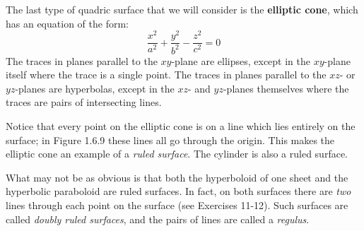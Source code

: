 The last type of quadric surface that we will consider is the \textbf{elliptic cone}, which has
an equation of the form:
\begin{equation}\label{eqn:ellipcone}
 \frac{x^2}{a^2} + \frac{y^2}{b^2} - \frac{z^2}{c^2} = 0
\end{equation}
The traces in planes parallel to the $xy$-plane are ellipses, except in the $xy$-plane itself where the trace is a
single point. The traces in planes parallel to the $xz$- or $yz$-planes are hyperbolas, except in the $xz$- and
$yz$-planes themselves where the traces are pairs of intersecting lines.

Notice that every point on the elliptic cone is on a line which lies entirely on the surface; in Figure 1.6.9 these
lines all go through the origin. This makes the elliptic
cone an example of a \emph{ruled surface}.
The cylinder is also a ruled surface.

What may not be as obvious is that both the hyperboloid of one sheet and the hyperbolic paraboloid are
ruled surfaces. In fact, on both surfaces there are \emph{two} lines through each point on the surface (see Exercises
11-12). Such surfaces are called \emph{doubly ruled surfaces},
and the pairs of lines are called a \emph{regulus}.


